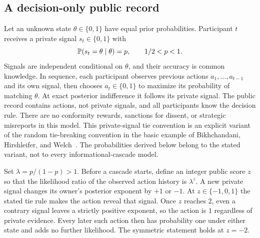 \subsection{A decision-only public record}
Let an unknown state $\theta\in\{0,1\}$ have equal prior probabilities. Participant $t$ receives a private signal $s_t\in\{0,1\}$ with
\[
\mathbb P(s_t=\theta\mid\theta)=p,\qquad 1/2<p<1.
\]
Signals are independent conditional on $\theta$, and their accuracy is common knowledge. In sequence, each participant observes previous actions $a_1,\ldots,a_{t-1}$ and its own signal, then chooses $a_t\in\{0,1\}$ to maximize its probability of matching $\theta$. At exact posterior indifference it follows its private signal. The public record contains actions, not private signals, and all participants know the decision rule. There are no conformity rewards, sanctions for dissent, or strategic misreports in this model. This private-signal tie convention is an explicit variant of the random tie-breaking convention in the basic example of Bikhchandani, Hirshleifer, and Welch~\cite{MS:bikhchandani1992}. The probabilities derived below belong to the stated variant, not to every informational-cascade model.

Set $\lambda=p/(1-p)>1$. Before a cascade starts, define an integer public score $z$ so that the likelihood ratio of the observed action history is $\lambda^z$. A new private signal changes its owner's posterior exponent by $+1$ or $-1$. At $z\in\{-1,0,1\}$ the stated tie rule makes the action reveal that signal. Once $z$ reaches $2$, even a contrary signal leaves a strictly positive exponent, so the action is $1$ regardless of private evidence. Every later such action then has probability one under either state and adds no further likelihood. The symmetric statement holds at $z=-2$.

